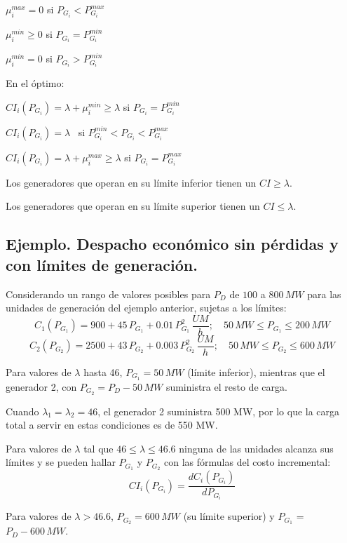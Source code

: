 			$\mu_i^{max} =    0$ si $P_{G_i} < P_{G_i}^{max}$
			
			$\mu_i^{min} \geq 0$ si $P_{G_i} = P_{G_i}^{min}$
			
			$\mu_i^{min} =    0$ si $P_{G_i} > P_{G_i}^{min}$
			
			
			\vspace{0.25cm}
			En el óptimo:
			
			$CI_i(P_{G_i}) = \lambda + \mu_i^{min} \geq \lambda$ \quad si $P_{G_i} = P_{G_i}^{min}$
			
			$CI_i(P_{G_i}) = \lambda$ \qquad \qquad \qquad \, si $P_{G_i}^{min} < P_{G_i} < P_{G_i}^{max}$
			
			$CI_i(P_{G_i}) = \lambda + \mu_i^{max} \geq \lambda$ \quad si $P_{G_i} = P_{G_i}^{max}$
			
			
			\vspace{0.5cm}
			Los generadores que operan en su límite inferior tienen un $CI \geq \lambda$.
			
			
			Los generadores que operan en su límite superior tienen un $CI \leq \lambda$.
			
			
		\subsection*{Ejemplo. Despacho económico sin pérdidas y con límites de generación.}
			Considerando un rango de valores posibles para $P_D$ de $100$ a $800\,MW$ para las unidades de generación
			del ejemplo anterior, sujetas a los límites:
			\[C_1(P_{G_1}) = 900 + 45\, P_{G_1} + 0.01\, P_{G_1}^2\,\dfrac{UM}{h}; \quad 50\,MW \leq P_{G_1} \leq 200\,MW\]
			\[C_2(P_{G_2}) = 2500 + 43\, P_{G_2} + 0.003\, P_{G_2}^2\,\dfrac{UM}{h}; \quad 50\,MW \leq P_{G_2} \leq 600\,MW\]
			
			Para valores de $\lambda$ hasta 46, $P_{G_1} = 50\,MW$ (límite inferior), mientras que el generador 2, con $P_{G_2} = P_D - 50\,MW$ suministra el resto de carga.
			
			
			Cuando $\lambda_1 = \lambda_2 = 46$, el generador 2 suministra 500 MW, por lo que la carga total a servir en estas condiciones es de 550 MW.
			
			
			Para valores de $\lambda$ tal que $46 \leq \lambda \leq 46.6$ ninguna de las unidades alcanza sus límites y se pueden hallar $P_{G_1}$ y $P_{G_2}$ con las fórmulas del costo incremental:
			\[CI_i(P_{G_i}) = \dfrac{dC_i(P_{G_i})}{dP_{G_i}}\]
			
			
			Para valores de $\lambda > 46.6$, $P_{G_2} = 600\,MW$ (su límite superior) y $P_{G_1}$ = $P_D - 600\,MW$. 
			
